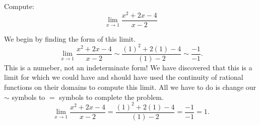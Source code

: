 \documentclass{ximera}
\begin{document}
\begin{example}
  Compute:
  \[
  \lim_{x\to1}\frac{x^2+2x-4}{x-2}
  \]
\begin{explanation}
  We begin by finding the form of this
  limit.
  \[
  \lim_{x\to1}\frac{x^2+2x-4}{x-2} \sim\frac{(1)^2+2(1)-4}{(1)-2} \sim \frac{-1}{-1}.
  \]
  This is a numeber, not an indeterminate form! We have discovered
  that this is a limit for which we could have and should have used
  the continuity of rational functions on their domains to compute
  this limit.  All we have to do is change our $\sim$ symbols to $=$
  symbols to complete the problem.
  \[
  \lim_{x\to1}\frac{x^2+2x-4}{x-2} = \frac{(1)^2+2(1)-4}{(1)-2} =
  \frac{-1}{-1} =1.
  \]
\end{explanation}
\end{example}
\end{document}
